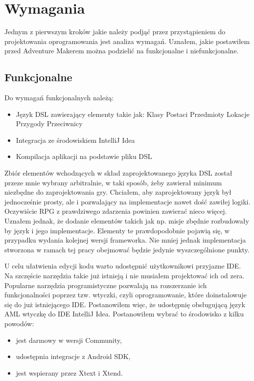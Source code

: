 \documentclass	{xmgr}
\begin{document}
\chapter{Wymagania}

Jednym z pierwszym kroków jakie należy podjąć przez przystąpieniem do projektowania oprogramowania jest analiza wymagań. Uznałem, jakie postawiłem przed Adventure Makerem można podzielić na funkcjonalne i niefunkcjonalne.

\section{Funkcjonalne}
Do wymagań funkcjonalnych należą:
\begin{itemize}
\item Język DSL zawierający elementy takie jak:
\subitem Klasy Postaci
\subitem Przedmioty
\subitem Lokacje
\subitem Przygody
\subitem Przeciwnicy
\item Integracja ze środowiskiem IntelliJ Idea
\item Kompilacja aplikacji na podstawie pliku DSL 
\end{itemize}

Zbiór elementów wchodzących w skład zaprojektowanego języka DSL został przeze mnie wybrany arbitralnie, w taki sposób, żeby zawierał minimum niezbędne do zaprojektowania gry. Chciałem, aby zaprojektowany język był jednocześnie prosty, ale i pozwalający na implementacje nawet dość zawiłej logiki. Oczywiście RPG z prawdziwego zdarzenia powinien zawierać nieco więcej. Uznałem jednak, że dodanie elementów takich jak np. misje zbędnie rozbudowały by język i jego implementacje. Elementy te prawdopodobnie pojawią się, w przypadku wydania kolejnej wersji frameworka. Nie mniej jednak implementacja stworzona w ramach tej pracy obejmować będzie jedynie wyszczególnione punkty.

U celu ułatwienia edycji kodu warto udostępnić użytkownikowi przyjazne IDE. Na szczęście narzędzia takie już istnieją i nie musiałem projektować ich od zera. Popularne narzędzia programistyczne pozwalają na rozszerzanie ich funkcjonalności poprzez tzw. wtyczki, czyli oprogramowanie, które doinstalowuje się do już istniejącego IDE. Postanowiłem więc, że udostępnię obsługującą język AML wtyczkę do IDE IntelliJ Idea. Postanowiłem wybrać to środowisko z kilku powodów:
\begin{itemize}	
\item jest darmowy w wersji Community,
\item udostępnia integracje z Android SDK,
\item jest wspierany przez Xtext i Xtend.
\end{itemize}
\end{document}
